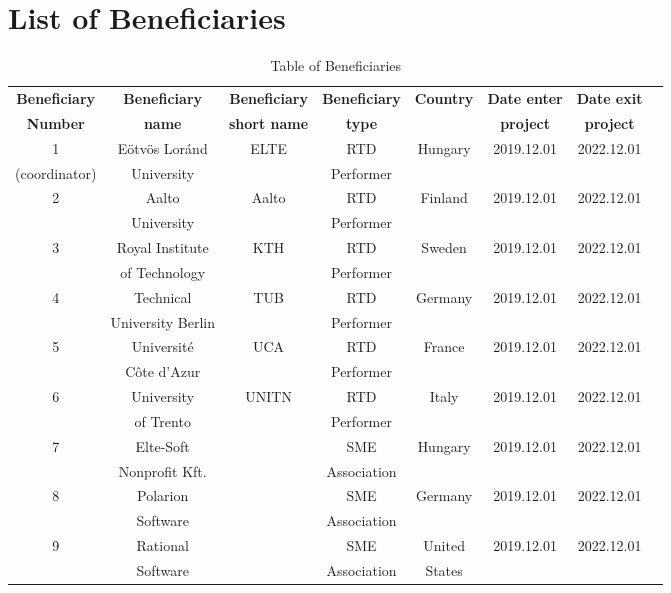\section{List of Beneficiaries}


\begin{table}[hbpt]\centering
	\begin{adjustbox}{width=1\textwidth}
		\begin{tabular}{ |c|c|c|c|c|c|c|c|} 
			\hline
			\textbf{Beneficiary} & \textbf{Beneficiary} & \textbf{Beneficiary} & \textbf{Beneficiary} & \textbf{Country} & \textbf{Date enter} & \textbf{Date exit} \\
			\textbf{Number} & \textbf{name} & \textbf{short name} & \textbf{type} & ~ & \textbf{project} & \textbf{project} \\
			\hline
			
			1 & Eötvös Loránd & ELTE & RTD & Hungary & 2019.12.01 & 2022.12.01 \\
			(coordinator) & University & ~ & Performer & ~ & ~ & ~ \\
			\hline
			
			2 & Aalto & Aalto & RTD  & Finland & 2019.12.01 & 2022.12.01 \\
			~ & University & ~ & Performer & ~ & ~ & ~ \\
			\hline
			
			3 & Royal Institute & KTH & RTD  & Sweden & 2019.12.01 & 2022.12.01 \\
			~ & of Technology &  ~ & Performer & ~ & ~ & ~ \\
			\hline
			
			4 & Technical & TUB & RTD  & Germany & 2019.12.01 & 2022.12.01 \\
			~ & University Berlin &  ~ & Performer & ~ & ~ & ~ \\
			\hline
			
			5 & Université & UCA & RTD  & France & 2019.12.01 & 2022.12.01 \\
			~ & Côte d’Azur &  ~ & Performer & ~ & ~ & ~ \\
			\hline
			
			6 & University & UNITN & RTD  & Italy & 2019.12.01 & 2022.12.01 \\
			~ & of Trento &  ~ & Performer & ~ & ~ & ~ \\
			\hline
			
			7 & Elte-Soft & ~ & SME  & Hungary & 2019.12.01 & 2022.12.01 \\
			~ & Nonprofit Kft. &  ~ & Association & ~ & ~ & ~ \\
			\hline
			
			8 & Polarion & ~ & SME  & Germany & 2019.12.01 & 2022.12.01 \\
			~ & Software &  ~ & Association & ~ & ~ & ~ \\
			\hline
			
			9 & Rational & ~ & SME & United & 2019.12.01 & 2022.12.01 \\
			~ & Software &  ~ & Association & States & ~ & ~ \\
			\hline
		\end{tabular}
	\end{adjustbox}
	\caption{Table of Beneficiaries}
\end{table}
